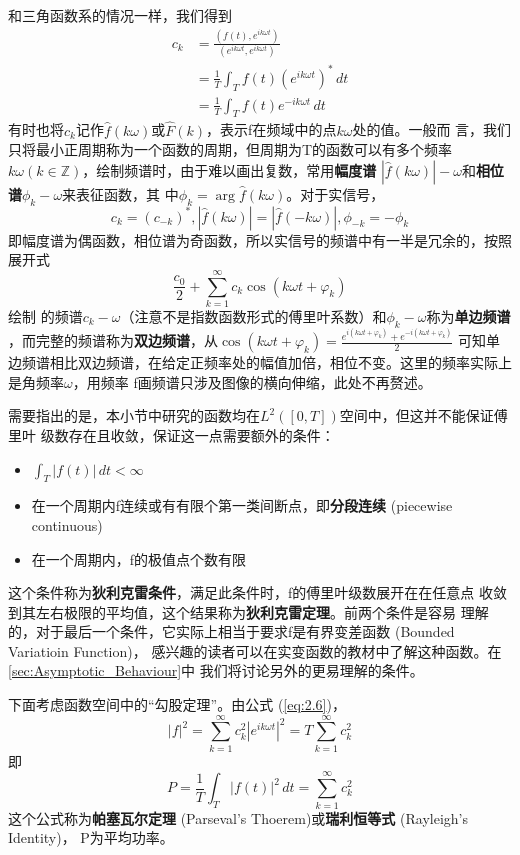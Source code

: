 \documentclass{ctexbook}
\begin{document}
和三角函数系的情况一样，我们得到
\begin{align*}
    c_k & =\frac{(f(t),e^{ik\omega t})}{(e^{ik\omega t},e^{ik\omega t})} \\
        & =\frac{1}{T}\int_{T}f(t)(e^{ik\omega t})^*\,dt                 \\
        & =\frac{1}{T}\int_{T}f(t)e^{-ik\omega t}\,dt
\end{align*}
有时也将$c_k$记作$\hat{f}(k\omega)$或$\hat{F}(k)$，表示f在频域中的点$k\omega$处的值。一般而
言，我们只将最小正周期称为一个函数的周期，但周期为T的函数可以有多个频率
$k\omega(k \in \mathbb{Z})$，绘制频谱时，由于难以画出复数，常用\textbf{幅度谱}
$|\hat{f}(k\omega)|-\omega$和\textbf{相位谱}$\phi_k-\omega$来表征函数，其
中$\phi_k=\arg\hat{f}(k\omega)$。对于实信号，
\[c_k=(c_{-k})^*,|\hat{f}(k\omega)|=|\hat{f}(-k\omega)|,\phi_{-k}=-\phi_k\]
即幅度谱为偶函数，相位谱为奇函数，所以实信号的频谱中有一半是冗余的，按照展开式
\[\frac{c_0}{2}+\sum_{k = 1}^{\infty} c_k\cos(k\omega t+\varphi _k)\]绘制
的频谱$c_k-\omega$（注意不是指数函数形式的傅里叶系数）和$\phi_k-\omega$称为\textbf{单边频谱}
，而完整的频谱称为\textbf{双边频谱}，从$\cos(k\omega t+\varphi _k)=\frac{e^{i(k\omega t+\varphi_k)}+e^{-i(k\omega t+\varphi_k)}}{2}$
可知单边频谱相比双边频谱，在给定正频率处的幅值加倍，相位不变。这里的频率实际上是角频率$\omega$，用频率
f画频谱只涉及图像的横向伸缩，此处不再赘述。

需要指出的是，本小节中研究的函数均在$L^2([0,T])$空间中，但这并不能保证傅里叶
级数存在且收敛，保证这一点需要额外的条件：
\begin{itemize}[nosep, left=0pt]
    \item $\int_{T}|f(t)|\,dt<\infty$
    \item 在一个周期内f连续或有有限个第一类间断点，即\textbf{分段连续} (piecewise continuous)
    \item 在一个周期内，f的极值点个数有限
\end{itemize}
这个条件称为\textbf{狄利克雷条件}，满足此条件时，f的傅里叶级数展开在在任意点
收敛到其左右极限的平均值，这个结果称为\textbf{狄利克雷定理}。前两个条件是容易
理解的，对于最后一个条件，它实际上相当于要求f是有界变差函数 (Bounded Variatioin Function)，
感兴趣的读者可以在实变函数的教材中了解这种函数。在\ref{sec:Asymptotic_Behaviour}中
我们将讨论另外的更易理解的条件。

下面考虑函数空间中的“勾股定理”。由公式 (\ref{eq:2.6})，
\[|f|^2=\sum_{k=1}^{\infty}c_k^2|e^{ik\omega t}|^2=T\sum_{k=1}^{\infty}c_k^2\]
即\[P=\frac{1}{T}\int_{T}|f(t)|^2\,dt=\sum_{k=1}^{\infty}c_k^2\]
这个公式称为\textbf{帕塞瓦尔定理} (Parseval's Thoerem)或\textbf{瑞利恒等式} (Rayleigh's Identity)，
P为平均功率。
\end{document}
